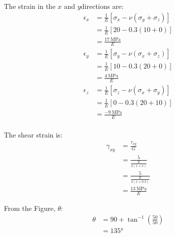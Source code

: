 The strain in the $x$ and $y$directions are:
\begin{align*}
    \epsilon_x &= \frac{1}{E}[\sigma_x - \nu(\sigma_y + \sigma_z)] \\
    &= \frac{1}{E}[20 - 0.3(10 + 0)] \\
    &= \frac{\qty{17}{\mega\pascal}}{E} \\
    \epsilon_y &= \frac{1}{E}[\sigma_y - \nu(\sigma_x + \sigma_z)] \\
    &= \frac{1}{E}[10 - 0.3(20 + 0)] \\
    &= \frac{\qty{4}{\mega\pascal}}{E} \\
    \epsilon_z &= \frac{1}{E}[\sigma_z - \nu(\sigma_x + \sigma_y)] \\
    &= \frac{1}{E}[0 - 0.3(20 + 10)] \\
    &= \frac{\qty{-9}{\mega\pascal}}{E} \\
\end{align*}

The shear strain is:
\begin{align*}
    \gamma_{xy} &= \frac{\tau_{xy}}{G} \\
    &= \frac{5}{\frac{E}{2(1+\nu)}} \\
    &= \frac{5}{\frac{E}{2(1+0.3)}} \\
    &= \frac{\qty{13}{\mega\pascal}}{E} 
\end{align*}

From the Figure, $\theta$:
\begin{align*}
    \theta &= 90 + \tan^{-1}\left(\frac{50}{50}\right) \\
    &=  \ang{135}
\end{align*}

